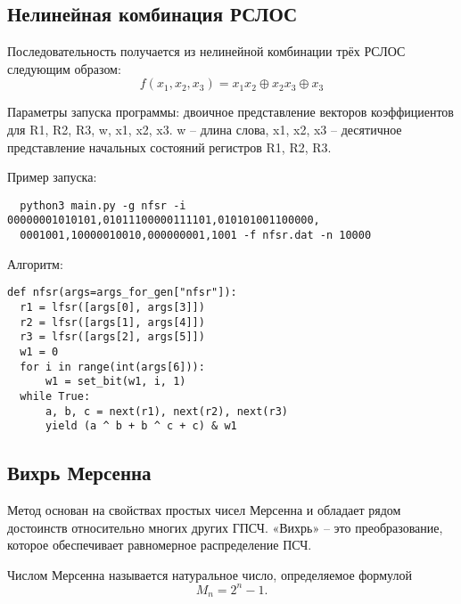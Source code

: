 \documentclass[spec, och, labwork]{shiza}
\begin{document}
\subsection{Нелинейная комбинация РСЛОС}

Последовательность получается из нелинейной комбинации трёх РСЛОС следующим образом:
\begin{equation}
  f(x_1, x_2, x_3) = x_1 x_2 \oplus x_2 x_3 \oplus x_3
\end{equation}


Параметры запуска программы: двоичное представление векторов коэффициентов
для R1, R2, R3, w, x1, x2, x3. w – длина слова, x1, x2, x3 – десятичное представление
начальных состояний регистров R1, R2, R3.

Пример запуска:
\begin{small}
\begin{verbatim}
  python3 main.py -g nfsr -i 00000001010101,01011100000111101,010101001100000,
  0001001,10000010010,000000001,1001 -f nfsr.dat -n 10000
\end{verbatim}
\end{small}

Алгоритм:
\begin{small}
\begin{verbatim}
def nfsr(args=args_for_gen["nfsr"]):
  r1 = lfsr([args[0], args[3]])
  r2 = lfsr([args[1], args[4]])
  r3 = lfsr([args[2], args[5]])
  w1 = 0
  for i in range(int(args[6])):
      w1 = set_bit(w1, i, 1)
  while True:
      a, b, c = next(r1), next(r2), next(r3)
      yield (a ^ b + b ^ c + c) & w1
\end{verbatim}
\end{small}



\subsection{Вихрь Мерсенна}

Метод основан на свойствах простых чисел Мерсенна и обладает рядом
достоинств относительно многих других ГПСЧ. «Вихрь» – это преобразование, которое обеспечивает
равномерное распределение ПСЧ.

Числом Мерсенна называется натуральное число, определяемое формулой
\begin{equation}
  M_n = 2^n - 1.
\end{equation}
\end{document}

